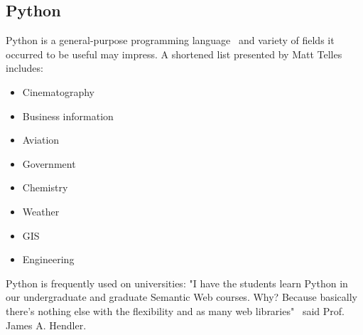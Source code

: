 \subsection{Python}\label{subsec:py}
Python is a general-purpose programming language~\cite[page 3]{py_nutshell} and variety of fields it occurred to be useful may impress. A shortened list presented by Matt Telles~\cite[page 13]{py_power} includes:
\begin{itemize}
\item{Cinematography}
\item{Business information}
\item{Aviation}
\item{Government}
\item{Chemistry}
\item{Weather}
\item{GIS}
\item{Engineering}
\end{itemize}
Python is frequently used on universities: "I have the students learn Python in our undergraduate and graduate Semantic Web courses. Why? Because basically there's nothing else with the flexibility and as many web libraries"~\cite{py_quote} said Prof. James A. Hendler. 

